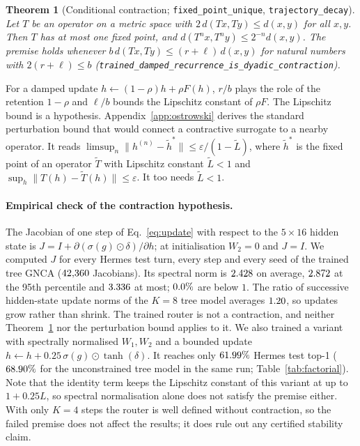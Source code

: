 \documentclass[10pt,twocolumn,letterpaper]{article}
\newtheorem{theorem}{Theorem}
\begin{document}
\begin{theorem}[Conditional contraction; \texttt{fixed\_\allowbreak{}point\_\allowbreak{}unique}, \texttt{trajectory\_\allowbreak{}decay}]\label{thm:contraction}
Let $T$ be an operator on a metric space with $2\,d(T x, T y) \le d(x,y)$ for all $x,y$. Then $T$ has at most one fixed point, and $d(T^n x, T^n y) \le 2^{-n} d(x,y)$. The premise holds whenever $b\,d(Tx,Ty)\le(r+\ell)\,d(x,y)$ for natural numbers with $2(r+\ell)\le b$ (\texttt{trained\_\allowbreak{}damped\_\allowbreak{}recurrence\_\allowbreak{}is\_\allowbreak{}dyadic\_\allowbreak{}contraction}).
\end{theorem}
For a damped update $h\leftarrow(1-\rho)h+\rho F(h)$, $r/b$ plays the role of the retention $1-\rho$ and $\ell/b$ bounds the Lipschitz constant of $\rho F$. The Lipschitz bound is a hypothesis. Appendix~\ref{app:ostrowski} derives the standard perturbation bound that would connect a contractive surrogate to a nearby operator. It reads $\limsup_n\|h^{(n)}-\tilde h^\ast\| \le \varepsilon/(1-\tilde L)$, where $\tilde h^\ast$ is the fixed point of an operator $\tilde T$ with Lipschitz constant $\tilde L<1$ and $\sup_h\|T(h)-\tilde T(h)\|\le\varepsilon$. It too needs $\tilde L<1$.

\paragraph{Empirical check of the contraction hypothesis.} The Jacobian of one step of Eq.~\eqref{eq:update} with respect to the $5\times16$ hidden state is $J = I + \partial(\sigma(g)\odot\delta)/\partial h$; at initialisation $W_2=0$ and $J=I$. We computed $J$ for every Hermes test turn, every step and every seed of the trained tree GNCA ($42{,}360$ Jacobians). Its spectral norm is $2.428$ on average, $2.872$ at the 95th percentile and $3.336$ at most; $0.0\%$ are below $1$. The ratio of successive hidden-state update norms of the $K{=}8$ tree model averages $1.20$, so updates grow rather than shrink. The trained router is not a contraction, and neither Theorem~\ref{thm:contraction} nor the perturbation bound applies to it. We also trained a variant with spectrally normalised $W_1,W_2$ and a bounded update $h \leftarrow h + 0.25\,\sigma(g)\odot\tanh(\delta)$. It reaches only $61.99\%$ Hermes test top-1 ($68.90\%$ for the unconstrained tree model in the same run; Table~\ref{tab:factorial}). Note that the identity term keeps the Lipschitz constant of this variant at up to $1+0.25L$, so spectral normalisation alone does not satisfy the premise either. With only $K{=}4$ steps the router is well defined without contraction, so the failed premise does not affect the results; it does rule out any certified stability claim.
\end{document}
